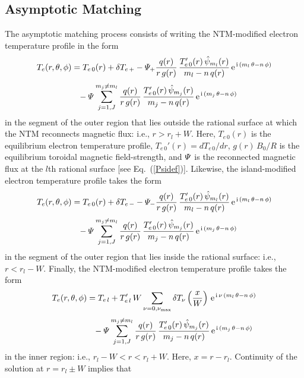 \documentclass{iopjournal}
\begin{document}
{\subsection{Asymptotic Matching}
The asymptotic matching process consists of writing the NTM-modified electron temperature profile in the form
\begin{align}
T_e(r,\theta,\phi)&= T_{e\,0}(r) +\delta T_{e\,+}-{\mit\Psi}_+\frac{q(r)}{r\,g(r)}\,\frac{T_{e\,0}'(r)\,\hat{\psi}_{m_l}(r)}{m_l-n\,q(r)}\,{\rm e}^{\,{\rm i}\,(m_l\,\theta-n\,\phi)}\nonumber\\[0.5ex]&\phantom{=}
-{\mit\Psi}\sum_{j=1,J}^{m_j\neq m_l} \frac{q(r)}{r\,g(r)}\,\frac{T_{e\,0}'(r)\,\hat{\psi}_{m_j}(r)}{m_j-n\,q(r)}\,{\rm e}^{\,{\rm i}\,(m_j\,\theta-n\,\phi)}
\end{align}
in the segment of the outer region that lies outside the rational surface at which the NTM reconnects magnetic flux: i.e., $r>r_l+W$. Here, $T_{e\,0}(r)$
is the equilibrium electron temperature profile, $T_{e\,0}'(r) = dT_{e\,0}/dr$, $g(r)\,B_0/R$ is the equilibrium toroidal magnetic field-strength, and 
${\mit\Psi}$ is the reconnected magnetic flux at the $l$th rational surface [see Eq.~(\ref{Psidef})]. 
Likewise, the
island-modified electron temperature profile takes the form
\begin{align}
T_e(r,\theta,\phi)&= T_{e\,0}(r) +\delta T_{e\,-}-{\mit\Psi}_-\frac{q(r)}{r\,g(r)}\,\frac{T_{e\,0}'(r)\,\hat{\psi}_{m_l}(r)}{m_l-n\,q(r)}\,{\rm e}^{\,{\rm i}\,(m_l\,\theta-n\,\phi)}\nonumber\\[0.5ex]&\phantom{=}
-{\mit\Psi}\sum_{j=1,J}^{m_j\neq m_l} \frac{q(r)}{r\,g(r)}\,\frac{T_{e\,0}'(r)\,\hat{\psi}_{m_j}(r)}{m_j-n\,q(r)}\,{\rm e}^{\,{\rm i}\,(m_j\,\theta-n\,\phi)}
\end{align}
in the segment of the outer region that lies inside the rational surface: i.e., $r<r_l-W$.  
Finally, the NTM-modified electron temperature profile 
takes the form
\begin{align}
T_e(r,\theta,\phi) &= T_{e\,l} + T_{e\,l}'\,W\sum_{\nu=0,\nu_{\rm max}}\delta T_\nu\left(\frac{x}{W}\right)\,{\rm e}^{\,{\rm i}\,\nu\,(m_l\,\theta-n\,\phi)}\nonumber\\[0.5ex]
&\phantom{=}
-{\mit\Psi}\sum_{j=1,J}^{m_j\neq m_l} \frac{q(r)}{r\,g(r)}\,\frac{T_{e\,0}'(r)\,\hat{\psi}_{m_j}(r)}{m_j-n\,q(r)}\,{\rm e}^{\,{\rm i}\,(m_j\,\theta-n\,\phi)}
\end{align}
in the inner region: i.e., $r_l-W<r<r_l+W$. Here, $x=r-r_l$.   Continuity of the solution at $r=r_l\pm W$ implies that
\begin{align}

\end{align}}
\end{document}
